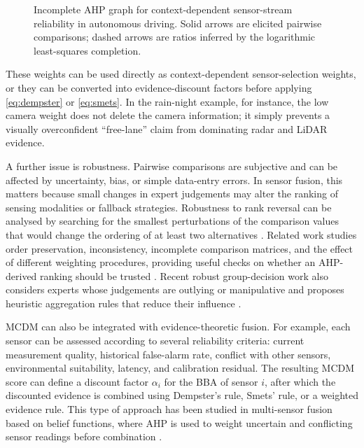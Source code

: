 \begin{example}
\begin{figure}[t]
    \caption{Incomplete AHP graph for context-dependent sensor-stream reliability in autonomous driving. Solid arrows are elicited pairwise comparisons; dashed arrows are ratios inferred by the logarithmic least-squares completion.}
    \label{fig:incomplete-ahp-autonomous-driving-example}
\end{figure}

These weights can be used directly as context-dependent sensor-selection weights, or they can be converted into evidence-discount factors before applying \eqref{eq:dempster} or \eqref{eq:smets}. In the rain-night example, for instance, the low camera weight does not delete the camera information; it simply prevents a visually overconfident ``free-lane'' claim from dominating radar and LiDAR evidence. 
\end{example}
\smallskip

A further issue is robustness. Pairwise comparisons are subjective and can be affected by uncertainty, bias, or simple data-entry errors. In sensor fusion, this matters because small changes in expert judgements may alter the ranking of sensing modalities or fallback strategies. Robustness to rank reversal can be analysed by searching for the smallest perturbations of the comparison values that would change the ordering of at least two alternatives \cite{faramondi_robustness_2023}. Related work studies order preservation, inconsistency, incomplete comparison matrices, and the effect of different weighting procedures, providing useful checks on whether an AHP-derived ranking should be trusted \cite{kulakowski_orderpreservation_2015,agoston_csato_inconsistency_2022,csato_agoston_bozoki_2024}. Recent robust group-decision work also considers experts whose judgements are outlying or manipulative and proposes heuristic aggregation rules that reduce their influence \cite{kulakowski_resilient_2024}.

MCDM can also be integrated with evidence-theoretic fusion. For example, each sensor can be assessed according to several reliability criteria: current measurement quality, historical false-alarm rate, conflict with other sensors, environmental suitability, latency, and calibration residual. The resulting MCDM score can define a discount factor \(\alpha_i\) for the BBA of sensor \(i\), after which the discounted evidence is combined using Dempster's rule, Smets' rule, or a weighted evidence rule. This type of approach has been studied in multi-sensor fusion based on belief functions, where AHP is used to weight uncertain and conflicting sensor readings before combination \cite{frikha_ahp_2015}.

